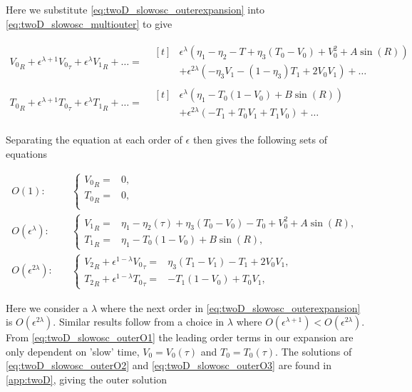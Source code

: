 Here we substitute \eqref{eq:twoD_slowosc_outerexpansion} into \eqref{eq:twoD_slowosc_multiouter} to give

\begin{equation*}
\begin{aligned}
{V_0}_R+\epsilon^{\lambda+1}{V_0}_\tau+\epsilon^\lambda {V_1}_R+\ldots=&\begin{aligned}[t]&
\epsilon^\lambda \left(\eta_1-\eta_2-T+\eta_3(T_0-V_0)+V_0^2+A\sin(R)\right)\\
&+\epsilon^{2\lambda}\left(-\eta_3 V_1-(1-\eta_3)T_1+2V_0V_1\right)+\ldots
\end{aligned}\\
{T_0}_R+\epsilon^{\lambda+1}{T_0}_\tau+\epsilon^\lambda {T_1}_R+\ldots=&\begin{aligned}[t]&
\epsilon^\lambda\left( \eta_1-T_0(1-V_0)+B\sin(R)\right)\\
&+\epsilon^{2\lambda}\left(-T_1+T_0V_1+T_1V_0\right)+\ldots
\end{aligned}
\end{aligned}
\end{equation*}

Separating the equation at each order of $\epsilon$ then gives the following sets of equations

\begin{align}
\label{eq:twoD_slowosc_outerO1}
O(1):\quad & \begin{cases}
	{V_0}_R =& 0, \\
	{T_0}_R =& 0,\\
\end{cases}\\
\label{eq:twoD_slowosc_outerO2}
O(\epsilon^\lambda):\quad & \begin{cases}
	{V_1}_R = & \eta_1-\eta_2(\tau) +\eta_3(T_0-V_0)-T_0+V_0^2+A\sin(R),\\
	{T_1}_R =& \eta_1-T_0(1-V_0)+B\sin(R),
\end{cases}\\
\label{eq:twoD_slowosc_outerO3}
O(\epsilon^{2\lambda}):\quad & \begin{cases}
	{V_2}_R+\epsilon^{1-\lambda}{V_0}_\tau = & \eta_3(T_1-V_1)-T_1+2V_0V_1,\\
	{T_2}_R +\epsilon^{1-\lambda}{T_0}_\tau =& -T_1(1-V_0)+T_0V_1,
\end{cases}
\end{align}

Here we consider a $\lambda$ where the next order in \eqref{eq:twoD_slowosc_outerexpansion} is $O(\epsilon^{2\lambda})$. Similar results follow from a choice in $\lambda$ where $O(\epsilon^{\lambda+1})<O(\epsilon^{2\lambda})$. From \eqref{eq:twoD_slowosc_outerO1} the leading order terms in our expansion are only dependent on 'slow' time, $V_0=V_0(\tau)$ and $T_0=T_0(\tau)$. The solutions of \eqref{eq:twoD_slowosc_outerO2} and \eqref{eq:twoD_slowosc_outerO3} are found in \autoref{app:twoD}, giving the outer solution 

